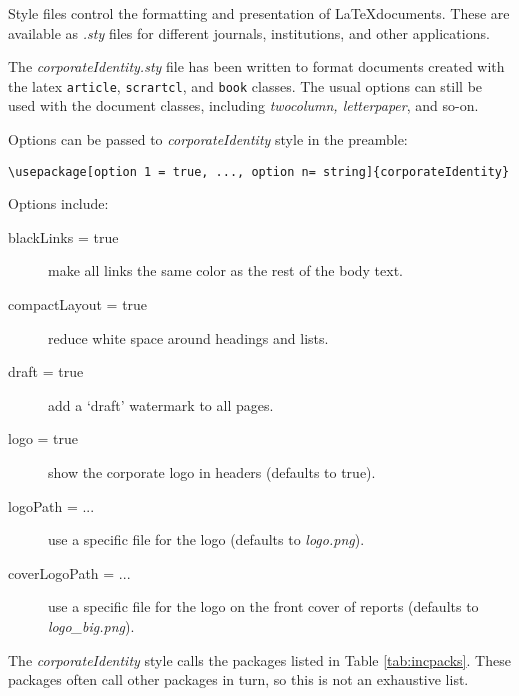 Style files control the formatting and presentation of \LaTeX documents. These are available as \emph{.sty} files for different journals, institutions, and other applications.

The \emph{corporateIdentity.sty} file has been written to format documents created with the latex \texttt{article}, \texttt{scrartcl}, and \texttt{book} classes. The usual options can still be used with the document classes, including \emph{twocolumn, letterpaper}, and so-on.

Options can be passed to \emph{corporateIdentity} style in the preamble:

\begin{lstlisting}
\usepackage[option 1 = true, ..., option n= string]{corporateIdentity}
\end{lstlisting}

Options include:
\begin{description}
\item[blackLinks = true]{make all links the same color as the rest of the body text.}
\item[compactLayout = true]{reduce white space around headings and lists.}
\item[draft = true]{add a `draft' watermark to all pages.}
\item[logo = true]{show the corporate logo in headers (defaults to true).}
\item[logoPath = ...]{use a specific file for the logo (defaults to \emph{logo.png}).}
\item[coverLogoPath = ...]{use a specific file for the logo on the front cover of reports (defaults to \emph{logo\_big.png}).}
\end{description}

The \emph{corporateIdentity} style calls the packages listed in Table \ref{tab:incpacks}. These packages often call other packages in turn, so this is not an exhaustive list.

